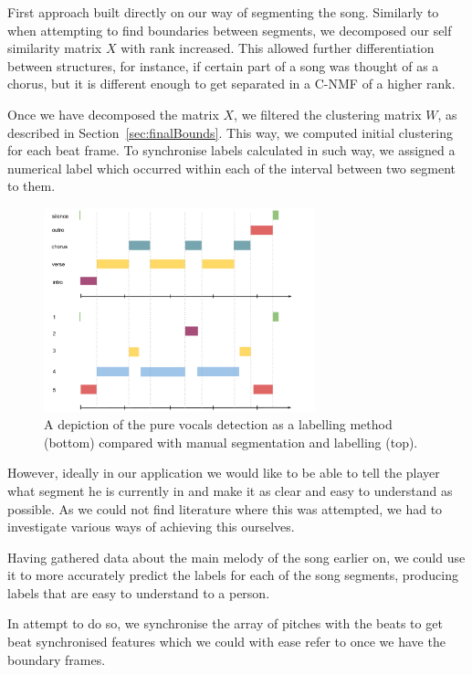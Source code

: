 First approach built directly on our way of segmenting the song.
Similarly to when attempting to find boundaries between segments, we decomposed our self similarity matrix $X$ with rank increased. This allowed further differentiation between structures, for instance, if certain part of a song was thought of as a chorus, but it is different enough to get separated in a C-NMF of a higher rank.

Once we have decomposed the matrix $X$, we filtered the clustering matrix $W$, as described in Section~\ref{sec:finalBounds}. This way, we computed initial clustering for each beat frame. To synchronise labels calculated in such way, we assigned a numerical label which occurred within each of the interval between two segment to them.

\begin{figure}[h]
	\centering
   \includegraphics[width=0.7\textwidth]{Figures/NumericalLabels}
\caption{A depiction of the pure vocals detection as a labelling method (bottom) compared with manual segmentation and labelling (top).}
\label{fig:numericsimple}
\end{figure}

However, ideally in our application we would like to be able to tell the player what segment he is currently in and make it as clear and easy to understand as possible. As we could not find literature where this was attempted, we had to investigate various ways of achieving this ourselves. 

Having gathered data about the main melody of the song earlier on, we could use it to more accurately predict the labels for each of the song segments, producing labels that are easy to understand to a person. 

In attempt to do so, we synchronise the array of pitches with the beats to get beat synchronised features which we could with ease refer to once we have the boundary frames. 

